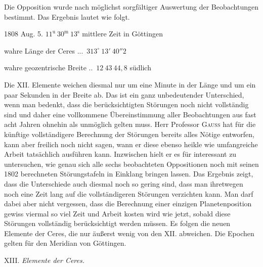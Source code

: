 \par\indent Die Opposition wurde nach möglichst sorgfältiger Auswertung der Beobachtungen bestimmt. Das Ergebnis lautet wie folgt.

\begin{center} 1808 Aug. 5. \quad $11^{\text{u}}\ 30^{\text{m}}\ 13^{\text{s}}$ mittlere Zeit in Göttingen

wahre Länge der Ceres .\;.\;.\;\ $313^\circ\ 13'\ 40''2$

wahre geozentrische Breite .\;.\;\ $12\ 43\ 44{,}8$ südlich
\end{center}

\par\indent Die XII. Elemente weichen diesmal nur um eine Minute in der Länge und um ein paar Sekunden in der Breite ab. Das ist ein ganz unbedeutender Unterschied, wenn man bedenkt, dass die berücksichtigten Störungen noch nicht vollständig sind und daher eine vollkommene Übereinstimmung aller Beobachtungen aus fast acht Jahren ohnehin als unmöglich gelten muss. Herr Professor \textsc{Gauss} hat für die künftige vollständigere Berechnung der Störungen bereits alles Nötige entworfen, kann aber freilich noch nicht sagen, wann er diese ebenso heikle wie umfangreiche Arbeit tatsächlich ausführen kann. Inzwischen hielt er es für interessant zu untersuchen, wie genau sich alle sechs beobachteten Oppositionen noch mit seinen 1802 berechneten Störungstafeln in Einklang bringen lassen. Das Ergebnis zeigt, dass die Unterschiede auch diesmal noch so gering sind, dass man ihretwegen noch eine Zeit lang auf die vollständigeren Störungen verzichten kann. Man darf dabei aber nicht vergessen, dass die Berechnung einer einzigen Planetenposition gewiss viermal so viel Zeit und Arbeit kosten wird wie jetzt, sobald diese Störungen vollständig berücksichtigt werden müssen. Es folgen die neuen Elemente der Ceres, die nur äußerst wenig von den XII. abweichen. Die Epochen gelten für den Meridian von Göttingen.

\begin{center} XIII. \emph{Elemente der Ceres.}
\end{center}


